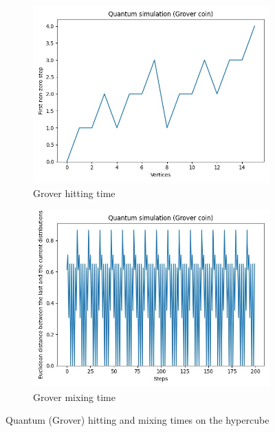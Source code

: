 \begin{figure}[H]
  \centering
  \begin{subfigure}{.45\linewidth}
    \centering
    \includegraphics[width=\linewidth]{./figures/results/hypercube/grover_hitting_time.jpg}
    \caption{Grover hitting time}
  \end{subfigure}
  \begin{subfigure}{.45\linewidth}
    \centering
    \includegraphics[width=\linewidth]{./figures/results/hypercube/grover_mixing_time.jpg}
    \caption{Grover mixing time}
  \end{subfigure}
  \caption{Quantum (Grover) hitting and mixing times on the hypercube}
\end{figure}


